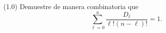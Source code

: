 (1.0) Demuestre de manera combinatoria que
\[\sum_{\ell=0}^{n} \frac{D_{\ell}}{\ell!(n-\ell)!}=1.\]
